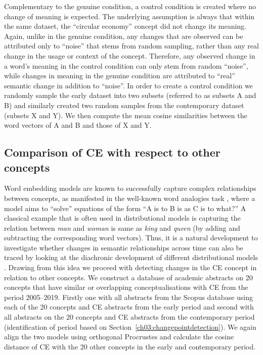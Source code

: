\documentclass[output=paper]{langsci/langscibook}
\begin{document}
Complementary to the genuine condition, a control condition is created where no change of meaning is expected. The underlying assumption is always that within the same dataset, the ``circular economy'' concept did not change its meaning. Again, unlike in the genuine condition, any changes that are observed can be attributed only to ``noise'' that stems from random sampling, rather than any real change in the usage or context of the concept. Therefore, any observed change in a word's meaning in the control condition can only stem from random ``noise'', while changes in meaning in the genuine condition are attributed to ``real'' semantic change in addition to ``noise''. In order to create a control condition we randomly sample the early dataset into two subsets (referred to as subsets A and B) and similarly created two random samples from the contemporary dataset  (subsets X and Y). We then compute the mean cosine similarities between the word vectors of A and B and those of X and Y. 

\subsection{Comparison of CE with respect to other concepts}
Word embedding models are known to successfully capture complex relationships between concepts, as manifested in the well-known word analogies task \citep{mikolov2013-distributed}, where a model aims to ``solve'' equations of the form ``A is to B is as C is to what?'' A classical example that is often used in distributional models is capturing the relation between \emph{man} and \emph{woman} is same as \emph{king} and \emph{queen} (by adding and subtracting the corresponding word vectors). Thus, it is a natural development to investigate whether changes in semantic relationships across time can also be traced by looking at the diachronic development of different distributional models \citep{kutuzov-etal-2018-diachronic}. Drawing from this idea we proceed with detecting changes in the CE concept in relation to other concepts. 
We construct a database of academic abstracts on 20 concepts that have similar or overlapping conceptualisations with CE from the period 2005--2019. Firstly one with all abstracts from the Scopus database using each of the 20 concepts and CE abstracts from the early period and second with all abstracts on the 20 concepts and CE abstracts from the contemporary period (identification of period based on Section~\ref{ch03:changepointdetection}).  We again align the two models using orthogonal Procrustes and calculate the cosine distance of CE with the 20 other concepts in the early and contemporary period. 
\end{document}
